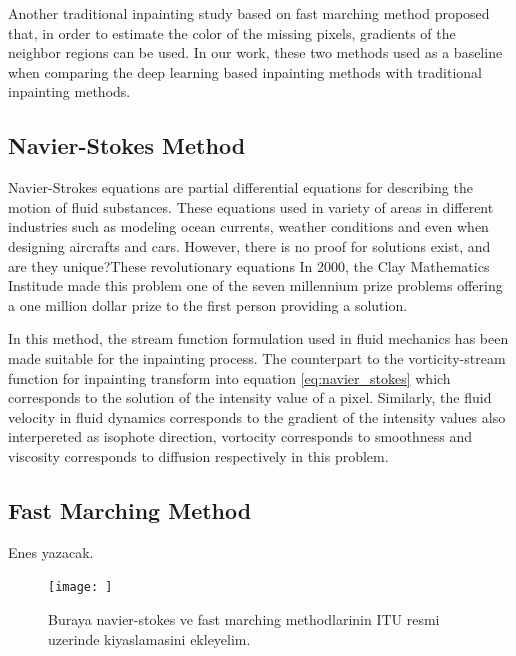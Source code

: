 Another traditional inpainting study based on fast marching method \cite{telea} proposed that, in order to estimate the color of the missing pixels, gradients of the neighbor regions can be used. In our work, these two methods used as a baseline when comparing the deep learning based inpainting methods with traditional inpainting methods.

\subsection{Navier-Stokes Method}

Navier-Strokes equations are partial differential equations for describing the motion of fluid substances. These equations used in variety of areas in different industries such as modeling ocean currents, weather conditions and even when designing aircrafts and cars. However, there is no proof for solutions exist, and are they unique?These revolutionary equations In 2000, the Clay Mathematics Institude made this problem one of the seven millennium prize problems \cite{clay} offering a one million dollar prize to the first person providing a solution.

In this method, the stream function formulation used in fluid mechanics has been made suitable for the inpainting process. The counterpart to the vorticity-stream function for inpainting transform into equation \ref{eq:navier_stokes} which corresponds to the solution of the intensity value of a pixel. Similarly, the fluid velocity in fluid dynamics corresponds to the gradient of the intensity values also interpereted as isophote direction, vortocity corresponds to smoothness and viscosity corresponds to diffusion respectively in this problem.

\subsection{Fast Marching Method}

Enes yazacak.

\begin{figure}[h]
    \centering
    \texttt{[image: ]}
    \caption{Buraya navier-stokes ve fast marching methodlarinin ITU resmi uzerinde kiyaslamasini ekleyelim.}
    \label{fig:traditional_comparison}
\end{figure}
